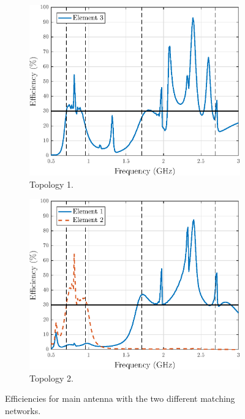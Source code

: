 \begin{figure}[H]
    \centering
    \begin{subfigure}[b]{0.49\textwidth}
        \includegraphics[width=\textwidth]{img/eff2_main.eps}
        \caption{Topology 1.}
        \label{fig:main_eff_top1}
    \end{subfigure}
    \begin{subfigure}[b]{0.49\textwidth}
        \includegraphics[width=\textwidth]{img/eff1_main.eps}
        \caption{Topology 2.}
        \label{fig:main_eff_top2}
    \end{subfigure}
    \caption{Efficiencies for main antenna with the two different matching networks.}
    \label{fig:main_eff}
\end{figure}

